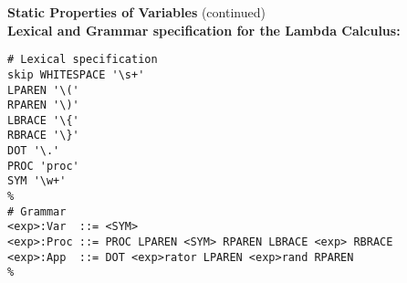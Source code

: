 \begin{minipage}[t]{\sw}
\slidenumber
\LARGE
{\bf Static Properties of Variables} (continued)\\[2ex]
{\bf Lexical and Grammar specification for the Lambda Calculus:}
\begin{verbatim}
# Lexical specification
skip WHITESPACE '\s+'
LPAREN '\('
RPAREN '\)'
LBRACE '\{'
RBRACE '\}'
DOT '\.'
PROC 'proc'
SYM '\w+'
%
# Grammar
<exp>:Var  ::= <SYM>
<exp>:Proc ::= PROC LPAREN <SYM> RPAREN LBRACE <exp> RBRACE
<exp>:App  ::= DOT <exp>rator LPAREN <exp>rand RPAREN
%
\end{verbatim}
\end{minipage}
\clearpage
